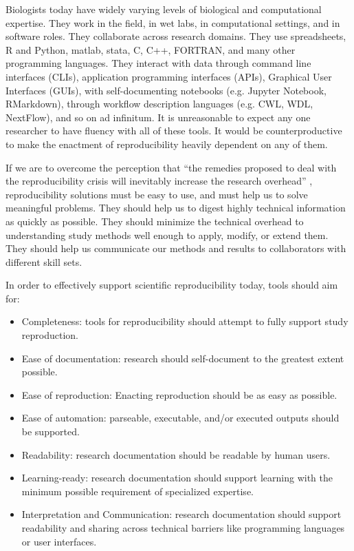 Biologists today have widely varying levels of biological and computational
expertise. They work in the field, in wet labs, in computational settings, and
in software roles. They collaborate across research domains. They use
spreadsheets, R and Python, matlab, stata, C, C++, FORTRAN, and many other
programming languages. They interact with data through command line interfaces
(CLIs), application programming interfaces (APIs), Graphical User Interfaces
(GUIs), with self-documenting notebooks (e.g. Jupyter Notebook, RMarkdown),
through workflow description languages (e.g. CWL, WDL, NextFlow), and so on ad
infinitum. It is unreasonable to expect any one researcher to have fluency with
all of these tools. It would be counterproductive to make the enactment of
reproducibility heavily dependent on any of them.

If we are to overcome the perception that “the remedies proposed to deal with
the reproducibility crisis will inevitably increase the research overhead” \parencite[2634]{shiffrin_scientific_2018},
reproducibility solutions must be easy to use, and must help us to solve
meaningful problems. They should help us to digest highly technical information
as quickly as possible. They should minimize the technical overhead to
understanding study methods well enough to apply, modify, or extend them. They
should help us communicate our methods and results to collaborators with
different skill sets.

In order to effectively support scientific reproducibility today, tools should
aim for:
\begin{itemize}
    \item Completeness: tools for reproducibility should attempt to fully support study reproduction.
    \item Ease of documentation: research should self-document to the greatest extent possible.
    \item Ease of reproduction: Enacting reproduction should be as easy as possible.
    \item Ease of automation: parseable, executable, and/or executed outputs should be supported.
    \item Readability: research documentation should be readable by human users.
    \item Learning-ready: research documentation should support learning with the minimum possible requirement of specialized expertise.
    \item Interpretation and Communication: research documentation should support readability and sharing across technical barriers like programming languages or user interfaces.
\end{itemize}


